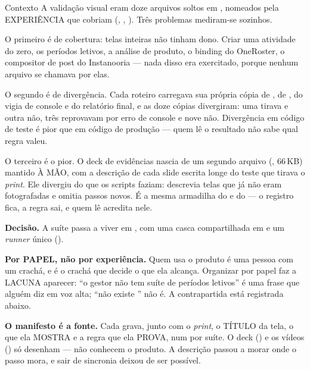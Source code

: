 \begin{especificacao}{Contexto}
A validação visual eram doze arquivos soltos em , nomeados pela
EXPERIÊNCIA que cobriam (, ,
). Três problemas mediram-se sozinhos.

O primeiro é de cobertura: telas inteiras não tinham dono. Criar uma atividade
do zero, os períodos letivos, a análise de produto, o binding do OneRoster, o
compositor de post do Instanooria --- nada disso era exercitado, porque nenhum
arquivo se chamava por elas.

O segundo é de divergência. Cada roteiro carregava sua própria cópia de
, de , do vigia de console e do relatório final, e as
doze cópias divergiram: uma tirava  e outra não, três reprovavam
por erro de console e nove não. Divergência em código de teste é pior que em
código de produção --- quem lê o resultado não sabe qual regra valeu.

O terceiro é o pior. O deck de evidências nascia de um segundo arquivo
(, 66\,KB) mantido À MÃO, com a descrição
de cada slide escrita longe do teste que tirava o \emph{print}. Ele divergiu do
que os scripts faziam: descrevia telas que já não eram fotografadas e omitia
passos novos. É a mesma armadilha do  e do
 --- o registro fica, a regra sai, e quem lê
acredita nele.
\end{especificacao}

\textbf{Decisão.} A suíte passa a viver em , com uma
casca compartilhada em  e um \emph{runner}
único ().

\textbf{Por PAPEL, não por experiência.} Quem usa o produto é uma pessoa com um
crachá, e é o crachá que decide o que ela alcança. Organizar por papel faz a
LACUNA aparecer: ``o gestor não tem suíte de períodos letivos'' é uma frase que
alguém diz em voz alta; ``não existe '' não é. A
contrapartida está registrada abaixo.

\textbf{O manifesto é a fonte.} Cada  grava, junto com o
\emph{print}, o TÍTULO da tela, o que ela MOSTRA e a regra que ela PROVA, num
 por suíte. O deck () e os vídeos
() só desenham --- não conhecem o produto. A descrição
passou a morar onde o passo mora, e sair de sincronia deixou de ser possível.

